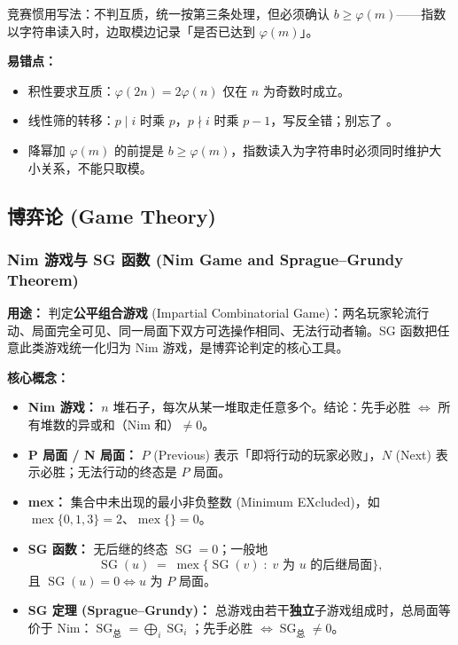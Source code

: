 竞赛惯用写法：不判互质，统一按第三条处理，但必须确认 $b \ge \varphi(m)$——指数以字符串读入时，边取模边记录「是否已达到 $\varphi(m)$」。

\textbf{易错点：}
\begin{itemize}
    \item 积性要求互质：$\varphi(2n) = 2\varphi(n)$ 仅在 $n$ 为奇数时成立。
    \item 线性筛的转移：$p \mid i$ 时乘 $p$，$p \nmid i$ 时乘 $p-1$，写反全错；别忘了 。
    \item 降幂加 $\varphi(m)$ 的前提是 $b \ge \varphi(m)$，指数读入为字符串时必须同时维护大小关系，不能只取模。
\end{itemize}

\subsection{博弈论 (Game Theory)}

\subsubsection{Nim 游戏与 SG 函数 (Nim Game and Sprague--Grundy Theorem)}

\textbf{用途：}  
判定\textbf{公平组合游戏} (Impartial Combinatorial Game)：两名玩家轮流行动、局面完全可见、同一局面下双方可选操作相同、无法行动者输。SG 函数把任意此类游戏统一化归为 Nim 游戏，是博弈论判定的核心工具。

\textbf{核心概念：}
\begin{itemize}
    \item \textbf{Nim 游戏：} $n$ 堆石子，每次从某一堆取走任意多个。结论：先手必胜 $\iff$ 所有堆数的异或和（Nim 和）$\ne 0$。
    \item \textbf{P 局面 / N 局面：} $P$ (Previous) 表示「即将行动的玩家必败」，$N$ (Next) 表示必胜；无法行动的终态是 $P$ 局面。
    \item \textbf{mex：} 集合中未出现的最小非负整数 (Minimum EXcluded)，如 $\operatorname{mex}\{0,1,3\}=2$、$\operatorname{mex}\{\}=0$。
    \item \textbf{SG 函数：} 无后继的终态 $\operatorname{SG}=0$；一般地
    \[ \operatorname{SG}(u) \;=\; \operatorname{mex}\{\operatorname{SG}(v) \;:\; v \text{ 为 } u \text{ 的后继局面}\}, \]
    且 $\operatorname{SG}(u)=0 \iff u$ 为 $P$ 局面。
    \item \textbf{SG 定理 (Sprague--Grundy)：} 总游戏由若干\textbf{独立}子游戏组成时，总局面等价于 Nim：$\operatorname{SG}_{\text{总}}=\bigoplus_i \operatorname{SG}_i$；先手必胜 $\iff \operatorname{SG}_{\text{总}}\ne 0$。
\end{itemize}

